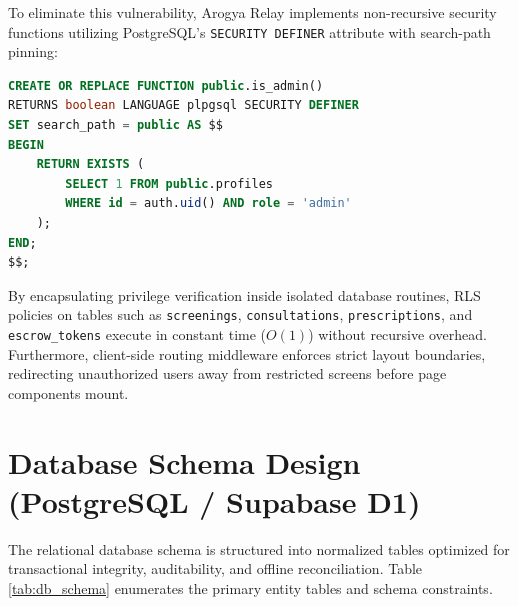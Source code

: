 \documentclass[12pt,a4paper,oneside]{report}
\begin{document}
To eliminate this vulnerability, Arogya Relay implements non-recursive security functions utilizing PostgreSQL's \texttt{SECURITY DEFINER} attribute with search-path pinning:

\begin{lstlisting}[language=SQL, caption={Non-Recursive Security Definer Procedure for Admin Verification}, label={lst:sql_admin}]
CREATE OR REPLACE FUNCTION public.is_admin()
RETURNS boolean LANGUAGE plpgsql SECURITY DEFINER
SET search_path = public AS $$
BEGIN
    RETURN EXISTS (
        SELECT 1 FROM public.profiles
        WHERE id = auth.uid() AND role = 'admin'
    );
END;
$$;
\end{lstlisting}

By encapsulating privilege verification inside isolated database routines, RLS policies on tables such as \texttt{screenings}, \texttt{consultations}, \texttt{prescriptions}, and \texttt{escrow\_tokens} execute in constant time ($O(1)$) without recursive overhead. Furthermore, client-side routing middleware enforces strict layout boundaries, redirecting unauthorized users away from restricted screens before page components mount.

\section{Database Schema Design (PostgreSQL / Supabase D1)}
The relational database schema is structured into normalized tables optimized for transactional integrity, auditability, and offline reconciliation. Table \ref{tab:db_schema} enumerates the primary entity tables and schema constraints.
\end{document}
